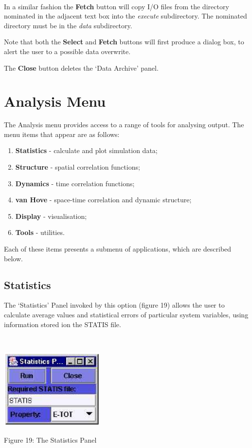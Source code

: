 ~

\noindent
In a similar fashion the {\bf Fetch} button will copy \DD{} I/O files
from the directory nominated in the adjacent text box into the {\em
execute} subdirectory. The nominated directory must be in the \DD{} {\em
data} subdirectory.

Note that both the {\bf Select} and {\bf Fetch} buttons will first
produce a dialog box, to alert the user to a possible data overwrite.

The {\bf Close} button deletes the `Data Archive' panel.

\section{Analysis Menu}
The Analysis menu provides access to a range of tools for analysing \DD{}
output. The menu items that appear are as follows:
\begin{enumerate}
\item {\bf Statistics} - calculate and plot simulation data;
\item {\bf Structure} - spatial correlation functions;
\item {\bf Dynamics} - time correlation functions;
\item {\bf van Hove} - space-time correlation and dynamic structure;
\item {\bf Display} - visualisation;
\item {\bf Tools} - utilities.
\end{enumerate}
Each of these items presents a submenu of applications, which are
described below.
\subsection{\bf Statistics}
The `Statistics' Panel invoked by this option (figure 19) allows the
user to calculate average values and statistical errors of particular
system variables, using information stored ion the \DD{} STATIS file.


~

\begin{center}
\centerline{\includegraphics[height=4cm]{stats.ps}}
\centerline{Figure 19: The Statistics Panel}
\end{center}

